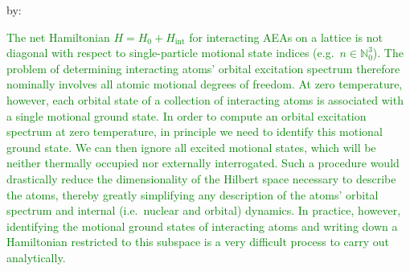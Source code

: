 \documentclass[preprint]{revtex4-1}
\renewcommand{\t}{\text} %
\newcommand{\1}{\mathds{1}}
\newcommand{\green}[1]{\textcolor{green}{#1}}
\begin{document}
\begin{enumerate}
  by:

  \green{The net Hamiltonian $H = H_0 + H_{\t{int}}$ for interacting
    AEAs on a lattice is not diagonal with respect to single-particle
    motional state indices (e.g.~$n\in\mathbb{N}_0^3$).  The problem
    of determining interacting atoms' orbital excitation spectrum
    therefore nominally involves all atomic motional degrees of
    freedom.  At zero temperature, however, each orbital state of a
    collection of interacting atoms is associated with a single
    motional ground state.  In order to compute an orbital excitation
    spectrum at zero temperature, in principle we need to identify
    this motional ground state.  We can then ignore all excited
    motional states, which will be neither thermally occupied nor
    externally interrogated.  Such a procedure would drastically
    reduce the dimensionality of the Hilbert space necessary to
    describe the atoms, thereby greatly simplifying any description of
    the atoms' orbital spectrum and internal (i.e.~nuclear and
    orbital) dynamics.  In practice, however, identifying the motional
    ground states of interacting atoms and writing down a Hamiltonian
    restricted to this subspace is a very difficult process to carry
    out analytically.}


\end{enumerate}
\end{document}
